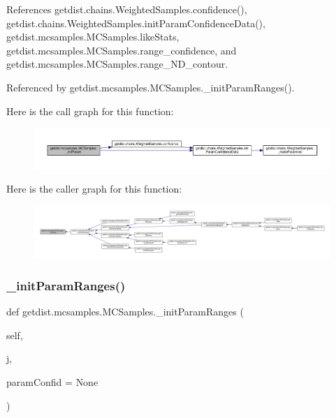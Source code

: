 References getdist.\+chains.\+Weighted\+Samples.\+confidence(), getdist.\+chains.\+Weighted\+Samples.\+init\+Param\+Confidence\+Data(), getdist.\+mcsamples.\+M\+C\+Samples.\+like\+Stats, getdist.\+mcsamples.\+M\+C\+Samples.\+range\+\_\+confidence, and getdist.\+mcsamples.\+M\+C\+Samples.\+range\+\_\+\+N\+D\+\_\+contour.



Referenced by getdist.\+mcsamples.\+M\+C\+Samples.\+\_\+init\+Param\+Ranges().

Here is the call graph for this function\+:
\nopagebreak
\begin{figure}[H]
\begin{center}
\leavevmode
\includegraphics[width=350pt]{classgetdist_1_1mcsamples_1_1MCSamples_ab6b6a1e603f89d1266dd7d2f5e6ae51c_cgraph}
\end{center}
\end{figure}
Here is the caller graph for this function\+:
\nopagebreak
\begin{figure}[H]
\begin{center}
\leavevmode
\includegraphics[width=350pt]{classgetdist_1_1mcsamples_1_1MCSamples_ab6b6a1e603f89d1266dd7d2f5e6ae51c_icgraph}
\end{center}
\end{figure}
\mbox{\label{classgetdist_1_1mcsamples_1_1MCSamples_a6b6dd422ba0e76f758c0ac875ea6ad74}} 
\subsubsection{\texorpdfstring{\+\_\+init\+Param\+Ranges()}{\_initParamRanges()}}
{\footnotesize\ttfamily def getdist.\+mcsamples.\+M\+C\+Samples.\+\_\+init\+Param\+Ranges (\begin{DoxyParamCaption}\item[{}]{self,  }\item[{}]{j,  }\item[{}]{param\+Confid = {\ttfamily None} }\end{DoxyParamCaption})\hspace{0.3cm}{\ttfamily [private]}}



